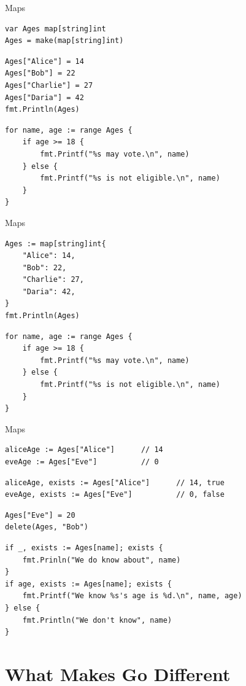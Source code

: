 \documentclass[pdf]{beamer}
\begin{document}
\begin{frame}[fragile]{Maps}
\begin{lstlisting}
var Ages map[string]int
Ages = make(map[string]int)
\end{lstlisting}
\pause
\begin{lstlisting}
Ages["Alice"] = 14
Ages["Bob"] = 22
Ages["Charlie"] = 27
Ages["Daria"] = 42
fmt.Println(Ages)
\end{lstlisting}
\pause
\begin{lstlisting}
for name, age := range Ages {
    if age >= 18 {
        fmt.Printf("%s may vote.\n", name)
    } else {
        fmt.Printf("%s is not eligible.\n", name)
    }
}
\end{lstlisting}
\end{frame}
\begin{frame}[fragile]{Maps}
\begin{lstlisting}
Ages := map[string]int{
    "Alice": 14,
    "Bob": 22,
    "Charlie": 27,
    "Daria": 42,
}
fmt.Println(Ages)
\end{lstlisting}
\begin{lstlisting}
for name, age := range Ages {
    if age >= 18 {
        fmt.Printf("%s may vote.\n", name)
    } else {
        fmt.Printf("%s is not eligible.\n", name)
    }
}
\end{lstlisting}
\end{frame}
\begin{frame}[fragile]{Maps}
\begin{lstlisting}
aliceAge := Ages["Alice"]      // 14
eveAge := Ages["Eve"]          // 0
\end{lstlisting}
\pause
\begin{lstlisting}
aliceAge, exists := Ages["Alice"]      // 14, true
eveAge, exists := Ages["Eve"]          // 0, false
\end{lstlisting}
\pause
\begin{lstlisting}
Ages["Eve"] = 20
delete(Ages, "Bob")
\end{lstlisting}
\pause
\begin{lstlisting}
if _, exists := Ages[name]; exists {
    fmt.Prinln("We do know about", name)
}
if age, exists := Ages[name]; exists {
    fmt.Printf("We know %s's age is %d.\n", name, age)
} else {
    fmt.Println("We don't know", name)
}
\end{lstlisting}
\end{frame}

\section{What Makes Go Different}
\end{document}
